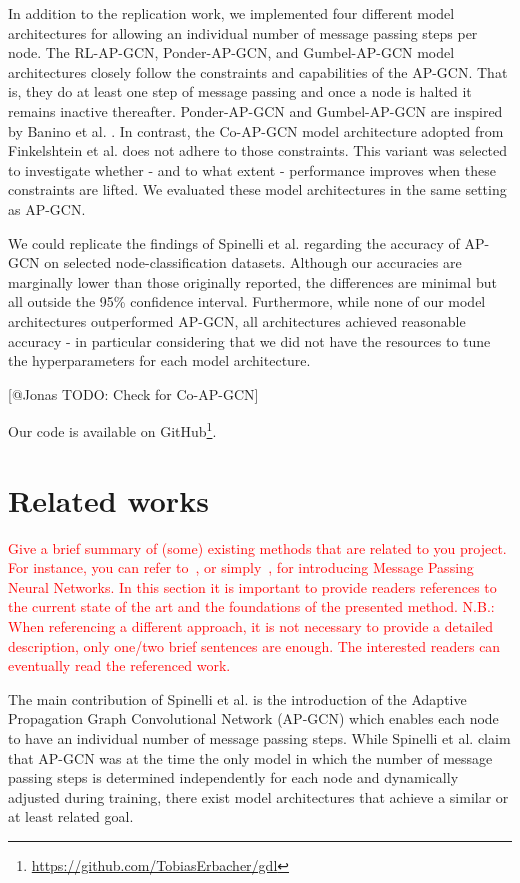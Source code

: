 \documentclass{gdl}
\begin{document}
In addition to the replication work, we implemented four different model architectures for allowing an individual number of message passing steps per node. The RL-AP-GCN, Ponder-AP-GCN, and Gumbel-AP-GCN model architectures closely follow the constraints and capabilities of the AP-GCN. That is, they do at least one step of message passing and once a node is halted it remains inactive thereafter. Ponder-AP-GCN and Gumbel-AP-GCN are inspired by Banino et al. \cite{banino2021}. In contrast, the Co-AP-GCN model architecture adopted from Finkelshtein et al. \cite{finkelshtein2024} does not adhere to those constraints. This variant was selected to investigate whether - and to what extent - performance improves when these constraints are lifted. We evaluated these model architectures in the same setting as AP-GCN.

We could replicate the findings of Spinelli et al. regarding the accuracy of AP-GCN on selected node-classification datasets. Although our accuracies are marginally lower than those originally reported, the differences are minimal but all outside the 95\% confidence interval. Furthermore, while none of our model architectures outperformed AP-GCN, all architectures achieved reasonable accuracy - in particular considering that we did not have the resources to tune the hyperparameters for each model architecture. 

[@Jonas TODO: Check for Co-AP-GCN]

Our code is available on GitHub\footnote{\url{https://github.com/TobiasErbacher/gdl}}.

\section{Related works}

\textcolor{red}{Give a brief summary of (some) existing methods that are related to you project. For instance, you can refer to~\citet{gilmer2017neural}, or simply~\cite{gilmer2017neural}, for introducing Message Passing Neural Networks. In this section it is important to provide readers references to the current state of the art and the foundations of the presented method. 
N.B.: When referencing a different approach, it is not necessary to provide a detailed description, only one/two brief sentences are enough. The interested readers can eventually read the referenced work. }


The main contribution of Spinelli et al. is the introduction of the Adaptive Propagation Graph Convolutional Network (AP-GCN) which enables each node to have an individual number of message passing steps. While Spinelli et al. claim that AP-GCN was at the time the only model in which the number of message passing steps is determined independently for each node and dynamically adjusted during training, there exist model architectures that achieve a similar or at least related goal.
\end{document}
